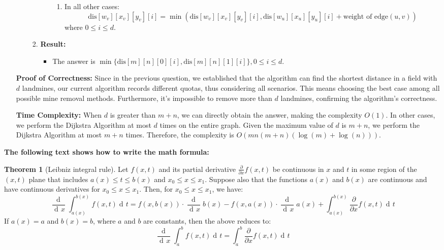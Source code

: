 \documentclass[letterpaper, 11pt]{article}
\newcommand{\1}{\mathds{1}}	%
\DeclareMathOperator*{\dv}{d\!}           %
\theoremstyle{definition}
\newtheorem*{theorem*}{Theorem}
\begin{document}
\begin{enumerate}[label=\arabic*., leftmargin=*, align=left, itemindent=0pt]
\begin{enumerate}
\begin{enumerate}
\begin{itemize}
\begin{enumerate}
                    \item In all other cases:
                    \[ \text{dis}[w_v][x_v][y_v][i] = \min(\text{dis}[w_v][x_v][y_v][i], \text{dis}[w_u][x_u][y_u][i] + \text{weight of edge}(u, v)) \]
                    where \( 0 \leq i \leq d \).
                \end{enumerate}
            \end{itemize}
            \item \textbf{Result:}
            \begin{itemize}
                \item The answer is \( \min\{\text{dis}[m][n][0][i], \text{dis}[m][n][1][i]\}, 0 \leq i \leq d \).
            \end{itemize}
        \end{enumerate}
        
        \end{enumerate}
        \textbf{Proof of Correctness:}
        Since in the previous question, 
        we established that the algorithm can find the shortest distance in a field with \( d \) landmines, 
        our current algorithm records different quotas, thus considering all scenarios. 
        This means choosing the best case among all possible mine removal methods. 
        Furthermore, it's impossible to remove more than \( d \) landmines, confirming the algorithm's correctness.
        
        \textbf{Time Complexity:}
        When \( d \) is greater than \( m + n \), 
        we can directly obtain the answer, 
        making the complexity \( O(1) \). 
        In other cases, we perform the Dijkstra Algorithm at most \( d \) times on the entire graph. 
        Given the maximum value of \( d \) is \( m + n \), 
        we perform the Dijkstra Algorithm at most \( m + n \) times. 
        Therefore, the complexity is \( O(mn(m+n)(\log(m) + \log(n))) \).
\end{enumerate}
\textbf{The following text shows how to write the math formula:}
\begin{theorem*}[Leibniz integral rule]
Let $f(x,t)$ and its partial derivative $\frac{\partial}{\partial x}f(x,t)$ be continuous in $x$ and $t$ in some region of the $(x,t)$ plane that includes $a(x)\leq t\leq b(x)$ and $x_0\leq x\leq x_1$. Suppose also that the functions $a(x)$ and $b(x)$ are continuous and have continuous derivatives for $x_0\leq x\leq x_1$. Then, for $x_0\leq x\leq x_1$, we have:
$$\frac{\dv}{\dv x}\int_{a(x)}^{b(x)}f(x,t)\dv t = f(x,b(x))\cdot \frac{\dv}{\dv x} b(x) - f(x, a(x))\cdot \frac{\dv}{\dv x}a(x) + \int_{a(x)}^{b(x)}\frac{\partial}{\partial x}f(x,t)\dv t$$
If $a(x)=a$ and $b(x)=b$, where $a$ and $b$ are constants, then the above reduces to:
$$\frac{\dv}{\dv x}\int_{a}^{b}f(x,t)\dv t = \int_a^b\frac{\partial}{\partial x}f(x,t)\dv t$$
\end{theorem*}
\end{document}
